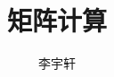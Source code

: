 \documentclass{notebook-neon}
\title{矩阵计算}
\author{李宇轩}
\begin{document}
\maketitle

\frontmatter

\makesymb

\tableofcontents
\listoffigures
\listoftables
\lstlistoflistings

\mainmatter

\nocite{*}








\appendix



\backmatter


\end{document}
